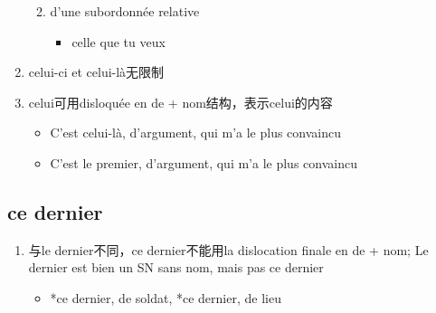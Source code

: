 \documentclass[UTF8]{report}
\begin{document}
\begin{enumerate}
\begin{enumerate}
\begin{itemize}
        \end{itemize}
        \item d’une subordonnée relative
        \begin{itemize}
            \item celle que tu veux
        \end{itemize}
    \end{enumerate}
    \item celui-ci et celui-là无限制
    \item celui可用disloquée en de + nom结构，表示celui的内容
    \begin{itemize}
        \item C’est celui-là, d’argument, qui m’a le plus convaincu
        \item C’est le premier, d’argument, qui m’a le plus convaincu
    \end{itemize}
\end{enumerate}

\subsection{ce dernier}

\begin{enumerate}
    \item 与le dernier不同，ce dernier不能用la dislocation finale en de + nom; Le dernier est bien un SN sans nom, mais pas ce dernier
    \begin{itemize}
        \item  *ce dernier, de soldat, *ce dernier, de lieu
    \end{itemize}
\end{enumerate}
\end{document}
